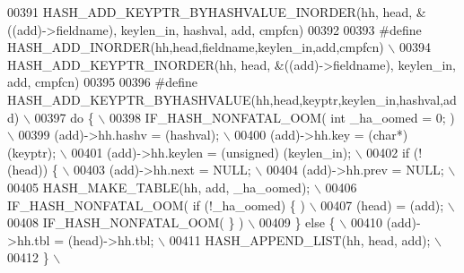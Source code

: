 \begin{DoxyCode}
{{{00391 \textcolor{preprocessor}{  HASH\_ADD\_KEYPTR\_BYHASHVALUE\_INORDER(hh, head, &((add)->fieldname), keylen\_in, hashval, add, cmpfcn)}
00392 
00393 \textcolor{preprocessor}{#define HASH\_ADD\_INORDER(hh,head,fieldname,keylen\_in,add,cmpfcn)                 \(\backslash\)}
00394 \textcolor{preprocessor}{  HASH\_ADD\_KEYPTR\_INORDER(hh, head, &((add)->fieldname), keylen\_in, add, cmpfcn)}
00395 
00396 \textcolor{preprocessor}{#define HASH\_ADD\_KEYPTR\_BYHASHVALUE(hh,head,keyptr,keylen\_in,hashval,add)        \(\backslash\)}
00397 \textcolor{preprocessor}{do \{                                                                             \(\backslash\)}
00398 \textcolor{preprocessor}{  IF\_HASH\_NONFATAL\_OOM( int \_ha\_oomed = 0; )                                     \(\backslash\)}
00399 \textcolor{preprocessor}{  (add)->hh.hashv = (hashval);                                                   \(\backslash\)}
00400 \textcolor{preprocessor}{  (add)->hh.key = (char*) (keyptr);                                              \(\backslash\)}
00401 \textcolor{preprocessor}{  (add)->hh.keylen = (unsigned) (keylen\_in);                                     \(\backslash\)}
00402 \textcolor{preprocessor}{  if (!(head)) \{                                                                 \(\backslash\)}
00403 \textcolor{preprocessor}{    (add)->hh.next = NULL;                                                       \(\backslash\)}
00404 \textcolor{preprocessor}{    (add)->hh.prev = NULL;                                                       \(\backslash\)}
00405 \textcolor{preprocessor}{    HASH\_MAKE\_TABLE(hh, add, \_ha\_oomed);                                         \(\backslash\)}
00406 \textcolor{preprocessor}{    IF\_HASH\_NONFATAL\_OOM( if (!\_ha\_oomed) \{ )                                    \(\backslash\)}
00407 \textcolor{preprocessor}{      (head) = (add);                                                            \(\backslash\)}
00408 \textcolor{preprocessor}{    IF\_HASH\_NONFATAL\_OOM( \} )                                                    \(\backslash\)}
00409 \textcolor{preprocessor}{  \} else \{                                                                       \(\backslash\)}
00410 \textcolor{preprocessor}{    (add)->hh.tbl = (head)->hh.tbl;                                              \(\backslash\)}
00411 \textcolor{preprocessor}{    HASH\_APPEND\_LIST(hh, head, add);                                             \(\backslash\)}
00412 \textcolor{preprocessor}{  \}                                                                              \(\backslash\)}
}}}
\end{DoxyCode}
